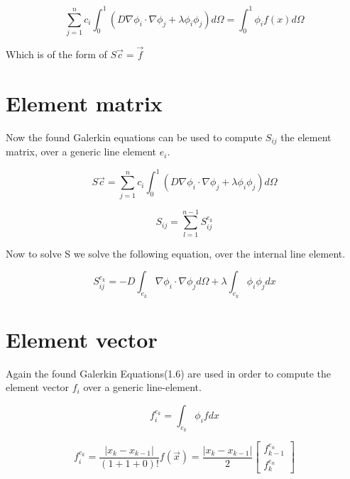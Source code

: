 \documentclass[a4paper]{report}
\begin{document}
\begin{equation}
	\sum_{j=1}^{n}c_i\int_{0}^{1} (D\nabla\phi_i\cdot\nabla\phi_j +\lambda\phi_i\phi_j )d\Omega = \int_{0}^{1} \phi_i f(x) d\Omega
\end{equation}
\medskip

Which is of the form of $ S\vec{c} = \vec{f} $

\section{Element matrix}
Now the found Galerkin equations can be used to compute $ S_{ij}$  the element matrix, over a generic line element $ e_i$.

\begin{equation}
S\vec{c}=	\sum_{j=1}^{n}c_i\int_{0}^{1} (D\nabla\phi_i\cdot\nabla\phi_j +\lambda\phi_i\phi_j )d\Omega
\end{equation}

\begin{equation}
S_{ij} =\sum_{l=1}^{n-1} S^{e_k}_{ij} 
\end{equation}
\medskip

Now to solve S we solve the following equation, over the internal line element.

\begin{equation}
S^{e_k}_{ij} = -D\int_{e_k}\nabla\phi_i\cdot\nabla\phi_j d\Omega+\lambda\int_{e_k}\phi_i\phi_j dx
\end{equation}


\section{Element vector}
Again the found Galerkin Equations(1.6) are used in order to compute the element vector $f_i$ over a generic line-element.

\begin{equation}
f^{e_k}_i = \int_{e_k}\phi_i f dx
\end{equation}

\begin{equation}
	f^{e_k}_i =\frac{\lvert x_k-x_{k-1}\lvert}{(1+1+0)!}f(\vec{x}) =\frac{\lvert x_k-x_{k-1}\lvert}{2}
	\begin{bmatrix} f^{e_n}_{k-1}\\ f^{e_n}_{k}
	\end{bmatrix}
\end{equation}
\end{document}
